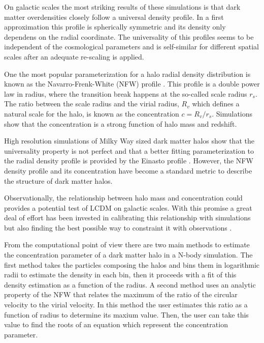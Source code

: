 \documentclass{emulateapj}
\begin{document}
On galactic scales the most striking results of these simulations is
that dark matter overdensities closely follow a universal density
profile. 
In a first approximation this profile is spherically symmetric and its
density only dependens on the radial coordinate.
The universality of this profiles seems to be independent of the
cosmological parameters and is self-similar for different spatial
scales after an adequate re-scaling is applied. 
\citep{NFW,Taylor2001}

One the most popular parameterization for a halo radial density
distribution is known as the Navarro-Frenk-White (NFW) profile
\citep{NFW}.
This profile is a  double power law in radius, where the transition break
happens at the so-called scale radius $r_s$.
The ratio between the scale radius and the virial radius, $R_v$ which
defines a natural scale for the halo, is known as the concentration
$c=R_v/r_s$. 
Simulations show that the concentration is a strong function of halo mass and
redshift. 


High resolution simulations of Milky Way sized dark matter halos
\citep{Navarro2010} show that the universality property is not
perfect and that a better fitting parameterization to the radial
density profile is provided by the Einasto profile
\citep{Einasto1965}.
However, the NFW density profile and its concentration have become a
standard metric to describe the structure of dark matter
halos.


Observationally, the relationship between halo mass and concentration
could provides a potential test of LCDM on galactic scales.
With this promise a great deal of effort has been
invested in calibrating this relationship with simulations
\citep{Neto2007,Duffy2008,Munoz2011,Prada2012,Ludlow2014} but also
finding the best possible way to constraint it with observations
\citep{Buote2007,Comerford2007,Mandelbaum2008,Giocoli2014,Foex2014,Shan2015}.

From the computational point of view there are two main methods to
estimate the concentration parameter of a dark matter halo in a N-body
simulation.
The first method takes the particles composing the halos
and bins them in logarithmic radii to estimate the density in each
bin, then it proceeds with a fit of this density estimation as a
function of the radius.
A second method uses an analytic property of the
NFW that relates the maximum of the ratio of the circular velocity to
the virial velocity.
In this method the user estimates this ratio as a function of radius
to determine its maxium value.
Then, the user can take this value to find the roots of an equation
which represent the concentration parameter.
\end{document}
